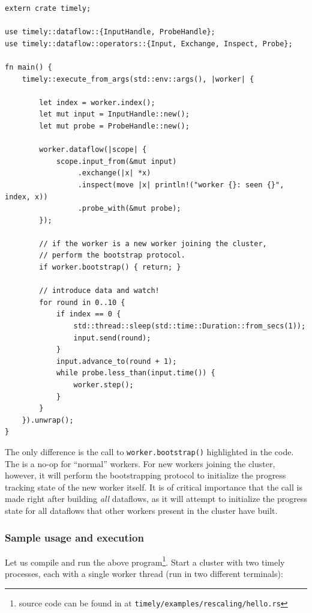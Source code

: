\documentclass[12pt]{extarticle}
\begin{document}
\begin{verbatim}
extern crate timely;

use timely::dataflow::{InputHandle, ProbeHandle};
use timely::dataflow::operators::{Input, Exchange, Inspect, Probe};

fn main() {
    timely::execute_from_args(std::env::args(), |worker| {

        let index = worker.index();
        let mut input = InputHandle::new();
        let mut probe = ProbeHandle::new();

        worker.dataflow(|scope| {
            scope.input_from(&mut input)
                 .exchange(|x| *x)
                 .inspect(move |x| println!("worker {}: seen {}", index, x))
                 .probe_with(&mut probe);
        });

        // if the worker is a new worker joining the cluster,
        // perform the bootstrap protocol.
        if worker.bootstrap() { return; }

        // introduce data and watch!
        for round in 0..10 {
            if index == 0 {
                std::thread::sleep(std::time::Duration::from_secs(1));
                input.send(round);
            }
            input.advance_to(round + 1);
            while probe.less_than(input.time()) {
                worker.step();
            }
        }
    }).unwrap();
}
\end{verbatim}

The only difference is the call to \verb|worker.bootstrap()| highlighted in the code.
The is a no-op for ``normal'' workers. For new workers joining the cluster, however,
it will perform the bootstrapping protocol to initialize the progress tracking state of the new worker itself.
It is of critical importance that the call is made right after building \textit{all} dataflows,
as it will attempt to initialize the progress state for all dataflows that other workers present
in the cluster have built.

\subsubsection{Sample usage and execution}

Let us compile and run the above program\footnote{source code can be found in at \verb|timely/examples/rescaling/hello.rs|}.
Start a cluster with two timely processes, each with a single worker thread (run in two different terminals):
\end{document}
